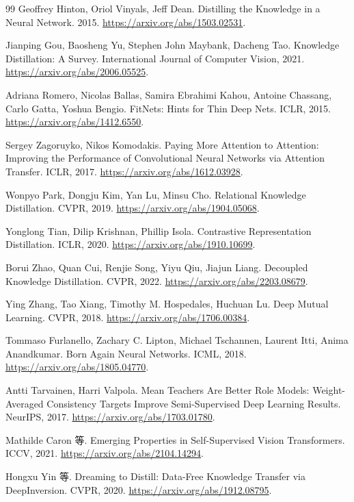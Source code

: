 \documentclass[UTF8,12pt,a4paper,fontset=fandol]{ctexart}
\begin{document}
\begin{thebibliography}{99}
Geoffrey Hinton, Oriol Vinyals, Jeff Dean.
Distilling the Knowledge in a Neural Network.
2015. \url{https://arxiv.org/abs/1503.02531}.

Jianping Gou, Baosheng Yu, Stephen John Maybank, Dacheng Tao.
Knowledge Distillation: A Survey.
International Journal of Computer Vision, 2021.
\url{https://arxiv.org/abs/2006.05525}.

Adriana Romero, Nicolas Ballas, Samira Ebrahimi Kahou, Antoine Chassang, Carlo Gatta, Yoshua Bengio.
FitNets: Hints for Thin Deep Nets.
ICLR, 2015. \url{https://arxiv.org/abs/1412.6550}.

Sergey Zagoruyko, Nikos Komodakis.
Paying More Attention to Attention: Improving the Performance of Convolutional Neural Networks via Attention Transfer.
ICLR, 2017. \url{https://arxiv.org/abs/1612.03928}.

Wonpyo Park, Dongju Kim, Yan Lu, Minsu Cho.
Relational Knowledge Distillation.
CVPR, 2019. \url{https://arxiv.org/abs/1904.05068}.

Yonglong Tian, Dilip Krishnan, Phillip Isola.
Contrastive Representation Distillation.
ICLR, 2020. \url{https://arxiv.org/abs/1910.10699}.

Borui Zhao, Quan Cui, Renjie Song, Yiyu Qiu, Jiajun Liang.
Decoupled Knowledge Distillation.
CVPR, 2022. \url{https://arxiv.org/abs/2203.08679}.

Ying Zhang, Tao Xiang, Timothy M. Hospedales, Huchuan Lu.
Deep Mutual Learning.
CVPR, 2018. \url{https://arxiv.org/abs/1706.00384}.

Tommaso Furlanello, Zachary C. Lipton, Michael Tschannen, Laurent Itti, Anima Anandkumar.
Born Again Neural Networks.
ICML, 2018. \url{https://arxiv.org/abs/1805.04770}.

Antti Tarvainen, Harri Valpola.
Mean Teachers Are Better Role Models: Weight-Averaged Consistency Targets Improve Semi-Supervised Deep Learning Results.
NeurIPS, 2017. \url{https://arxiv.org/abs/1703.01780}.

Mathilde Caron 等.
Emerging Properties in Self-Supervised Vision Transformers.
ICCV, 2021. \url{https://arxiv.org/abs/2104.14294}.

Hongxu Yin 等.
Dreaming to Distill: Data-Free Knowledge Transfer via DeepInversion.
CVPR, 2020. \url{https://arxiv.org/abs/1912.08795}.


\end{thebibliography}
\end{document}
